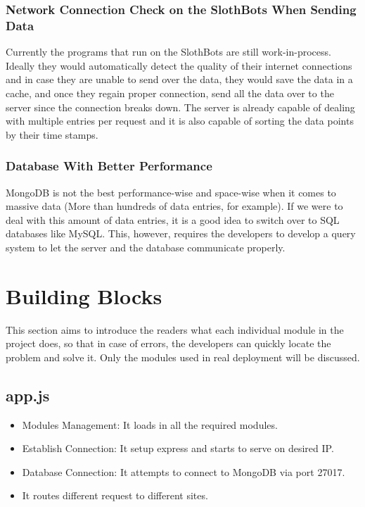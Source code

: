 \documentclass{article}
\begin{document}
\subsubsection{Network Connection Check on the SlothBots When Sending Data} Currently the programs that run on the SlothBots are still work-in-process. Ideally they would automatically detect the quality of 
their internet connections and in case they are unable to send over the data, they would save the data in a cache, and once they regain proper connection, send all the data 
over to the server since the connection breaks down. The server is already capable of dealing with multiple entries per request and it is also capable of sorting the data points
by their time stamps.
\subsubsection{Database With Better Performance} MongoDB is not the best performance-wise and space-wise when it comes to massive data (More than hundreds of data entries, for example). If we were to deal with this 
amount of data entries, it is a good idea to switch over to SQL databases like MySQL. This, however, requires the developers to develop a query system to let the server and the database communicate properly.



\newpage
\section{Building Blocks}
This section aims to introduce the readers what each individual module in the project does, so that in case of errors, the developers can quickly 
locate the problem and solve it. Only the modules used in real deployment will be discussed.
\subsection{app.js}
\begin{itemize}
  \item Modules Management: It loads in all the required modules.
  \item Establish Connection: It setup express and starts to serve on desired IP.
  \item Database Connection: It attempts to connect to MongoDB via port 27017.
  \item It routes different request to different sites.
\end{itemize}
\end{document}

